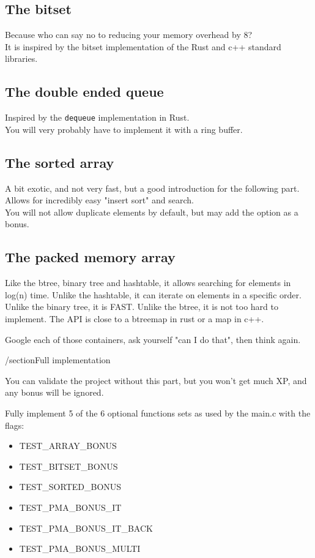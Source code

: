 \documentclass{42-en}
\begin{document}
        \subsection{The bitset}
        Because who can say no to reducing your memory overhead by 8?\\
        It is inspired by the bitset implementation of the Rust and c++ standard libraries.\\

        \subsection{The double ended queue}
        Inspired by the \texttt{dequeue} implementation in Rust.\\
        You will very probably have to implement it with a ring buffer.

        \subsection{The sorted array}
        A bit exotic, and not very fast, but a good introduction for the following part.
        Allows for incredibly easy "insert sort" and search.\\
        You will not allow duplicate elements by default, but may add the option as a bonus.

        \subsection{The packed memory array}
        Like the btree, binary tree and hashtable, it allows searching
        for elements in log(n) time. Unlike the hashtable, it can iterate on elements in
        a specific order. Unlike the binary tree, it is FAST. Unlike the btree,
        it is not too hard to implement. The API is close to a btreemap in rust or a map in c++.

        Google each of those containers, ask yourself "can I do that", then think again.

    /section{Full implementation}

        You can validate the project without this part, but you won't get much XP,
        and any bonus will be ignored.

        Fully implement 5 of the 6 optional functions sets as used by the main.c with the flags:
        \begin{itemize}\itemsep1pt
            \item TEST\_ARRAY\_BONUS
            \item TEST\_BITSET\_BONUS
            \item TEST\_SORTED\_BONUS
            \item TEST\_PMA\_BONUS\_IT
            \item TEST\_PMA\_BONUS\_IT\_BACK
            \item TEST\_PMA\_BONUS\_MULTI
        \end{itemize}
\end{document}
